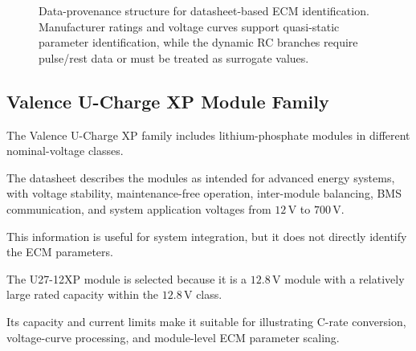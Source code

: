 \documentclass[a4paper,12pt]{article}
\begin{document}
\begin{figure}[H]
\caption{Data-provenance structure for datasheet-based ECM identification.
Manufacturer ratings and voltage curves support quasi-static parameter identification, while the dynamic RC branches require pulse/rest data or must be treated as surrogate values.}
\label{fig:data_provenance_ecm}
\end{figure}

\subsection{Valence U-Charge XP Module Family}

The Valence U-Charge XP family includes lithium-phosphate modules in different nominal-voltage classes.

The datasheet describes the modules as intended for advanced energy systems, with voltage stability, maintenance-free operation, inter-module balancing, BMS communication, and system application voltages from \(12\,\mathrm{V}\) to \(700\,\mathrm{V}\).

This information is useful for system integration, but it does not directly identify the ECM parameters.

The U27-12XP module is selected because it is a \(12.8\,\mathrm{V}\) module with a relatively large rated capacity within the \(12.8\,\mathrm{V}\) class.

Its capacity and current limits make it suitable for illustrating C-rate conversion, voltage-curve processing, and module-level ECM parameter scaling.
\end{document}

